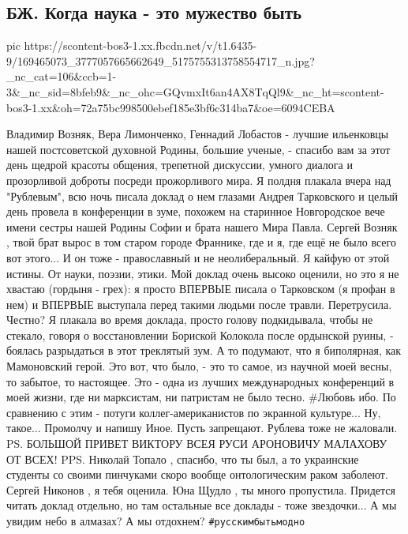  
 
 
 
 
\subsection{БЖ. Когда наука - это мужество быть}


\ifcmt
  pic https://scontent-bos3-1.xx.fbcdn.net/v/t1.6435-9/169465073_3777057665662649_5175755313758554717_n.jpg?_nc_cat=106&ccb=1-3&_nc_sid=8bfeb9&_nc_ohc=GQvmxIt6an4AX8TqQl9&_nc_ht=scontent-bos3-1.xx&oh=72a75bc998500ebef185e3bf6c314ba7&oe=6094CEBA
\fi


Владимир Возняк, Вера Лимонченко, Геннадий Лобастов - лучшие ильенковцы нашей постсоветской духовной Родины, большие ученые, - спасибо вам за этот день щедрой красоты общения, трепетной дискуссии, умного диалога и прозорливой доброты посреди прожорливого мира. 
Я полдня плакала вчера над "Рублевым", всю ночь писала доклад о нем глазами Андрея Тарковского и целый день провела в конференции в зуме, похожем на старинное Новгородское вече имени сестры нашей Родины Софии и брата нашего Мира Павла.
Сергей Возняк
 , твой брат вырос в том старом городе Франнике, где и я, где ещё не было всего вот этого... И он тоже - православный и не неолиберальный. Я кайфую от этой истины. От науки, поэзии, этики. Мой доклад очень высоко оценили, но это я не хвастаю (гордыня - грех): я просто ВПЕРВЫЕ писала о Тарковском (я профан в нем) и ВПЕРВЫЕ выступала перед такими людьми после травли. Перетрусила.
Честно? Я плакала во время доклада, просто голову подкидывала, чтобы не стекало, говоря о восстановлении Бориской Колокола после ордынской руины, - боялась разрыдаться в этот треклятый зум. А то подумают, что я биполярная, как Мамоновский герой.
Это вот, что было, - это то самое, из научной моей весны, то забытое, то настоящее. Это - одна из лучших международных конференций в моей жизни, где ни марксистам, ни патристам не было тесно. #Любовь ибо. По сравнению с этим - потуги коллег-американистов по экранной культуре... Ну, такое... Промолчу и напишу Иное. Пусть запрещают. Рублева тоже не жаловали.
PS. БОЛЬШОЙ ПРИВЕТ ВИКТОРУ ВСЕЯ РУСИ АРОНОВИЧУ МАЛАХОВУ ОТ ВСЕХ! 
PPS. Николай Топало
  , спасибо, что ты был, а то украинские студенты со своими пинчуками скоро вообще онтологическим раком заболеют. Сергей Никонов
 , я тебя оценила. Юна Щудло
 , ты много пропустила. Придется читать доклад отдельно, но там остальные все доклады - тоже звездочки... А мы увидим небо в алмазах? А мы отдохнем? \verb|#русскимбытьмодно|

